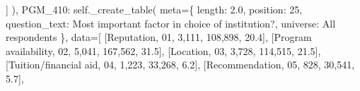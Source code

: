 \documentclass[
  11pt,
  a4paper,
]{article}
\newenvironment{Shaded}{\begin{snugshade}}{\end{snugshade}}
\newcommand{\NormalTok}[1]{\textcolor[rgb]{0.00,0.23,0.31}{#1}}
\newcommand{\OperatorTok}[1]{\textcolor[rgb]{0.37,0.37,0.37}{#1}}
\newcommand{\StringTok}[1]{\textcolor[rgb]{0.13,0.47,0.30}{#1}}
\newcommand{\VariableTok}[1]{\textcolor[rgb]{0.07,0.07,0.07}{#1}}
\begin{document}
\begin{Shaded}
\begin{Highlighting}[]
\NormalTok{                ]}
\NormalTok{            ),}
            \StringTok{\textquotesingle{}PGM\_410\textquotesingle{}}\NormalTok{: }\VariableTok{self}\NormalTok{.\_create\_table(}
\NormalTok{                meta}\OperatorTok{=}\NormalTok{\{}
                    \StringTok{\textquotesingle{}length\textquotesingle{}}\NormalTok{: }\StringTok{\textquotesingle{}2.0\textquotesingle{}}\NormalTok{, }\StringTok{\textquotesingle{}position\textquotesingle{}}\NormalTok{: }\StringTok{\textquotesingle{}25\textquotesingle{}}\NormalTok{,}
                    \StringTok{\textquotesingle{}question\_text\textquotesingle{}}\NormalTok{: }\StringTok{\textquotesingle{}Most important factor in choice of institution?\textquotesingle{}}\NormalTok{,}
                    \StringTok{\textquotesingle{}universe\textquotesingle{}}\NormalTok{: }\StringTok{\textquotesingle{}All respondents\textquotesingle{}}
\NormalTok{                \},}
\NormalTok{                data}\OperatorTok{=}\NormalTok{[}
\NormalTok{                    [}\StringTok{\textquotesingle{}Reputation\textquotesingle{}}\NormalTok{, }\StringTok{\textquotesingle{}01\textquotesingle{}}\NormalTok{, }\StringTok{\textquotesingle{}3,111\textquotesingle{}}\NormalTok{, }\StringTok{\textquotesingle{}108,898\textquotesingle{}}\NormalTok{, }\StringTok{\textquotesingle{}20.4\textquotesingle{}}\NormalTok{],}
\NormalTok{                    [}\StringTok{\textquotesingle{}Program availability\textquotesingle{}}\NormalTok{, }\StringTok{\textquotesingle{}02\textquotesingle{}}\NormalTok{, }\StringTok{\textquotesingle{}5,041\textquotesingle{}}\NormalTok{, }\StringTok{\textquotesingle{}167,562\textquotesingle{}}\NormalTok{, }\StringTok{\textquotesingle{}31.5\textquotesingle{}}\NormalTok{],}
\NormalTok{                    [}\StringTok{\textquotesingle{}Location\textquotesingle{}}\NormalTok{, }\StringTok{\textquotesingle{}03\textquotesingle{}}\NormalTok{, }\StringTok{\textquotesingle{}3,728\textquotesingle{}}\NormalTok{, }\StringTok{\textquotesingle{}114,515\textquotesingle{}}\NormalTok{, }\StringTok{\textquotesingle{}21.5\textquotesingle{}}\NormalTok{],}
\NormalTok{                    [}\StringTok{\textquotesingle{}Tuition/financial aid\textquotesingle{}}\NormalTok{, }\StringTok{\textquotesingle{}04\textquotesingle{}}\NormalTok{, }\StringTok{\textquotesingle{}1,223\textquotesingle{}}\NormalTok{, }\StringTok{\textquotesingle{}33,268\textquotesingle{}}\NormalTok{, }\StringTok{\textquotesingle{}6.2\textquotesingle{}}\NormalTok{],}
\NormalTok{                    [}\StringTok{\textquotesingle{}Recommendation\textquotesingle{}}\NormalTok{, }\StringTok{\textquotesingle{}05\textquotesingle{}}\NormalTok{, }\StringTok{\textquotesingle{}828\textquotesingle{}}\NormalTok{, }\StringTok{\textquotesingle{}30,541\textquotesingle{}}\NormalTok{, }\StringTok{\textquotesingle{}5.7\textquotesingle{}}\NormalTok{],}

\end{Highlighting}
\end{Shaded}
\end{document}
